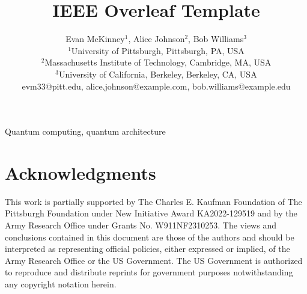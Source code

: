 \documentclass[10pt,conference]{IEEEtran}
\title{IEEE Overleaf Template}
\author{
    Evan McKinney$^{1}$, Alice Johnson$^{2}$, Bob Williams$^{3}$ \\ 
    $^{1}$University of Pittsburgh, Pittsburgh, PA, USA\\
    $^{2}$Massachusetts Institute of Technology, Cambridge, MA, USA\\
    $^{3}$University of California, Berkeley, Berkeley, CA, USA\\
    evm33@pitt.edu, alice.johnson@example.com, bob.williams@example.edu
}
\begin{document}
\maketitle



\begin{IEEEkeywords}
Quantum computing, quantum architecture
\end{IEEEkeywords}




\section*{Acknowledgments}
This work is partially supported by The Charles E. Kaufman Foundation of The Pittsburgh Foundation under New Initiative Award KA2022-129519 and by the Army Research Office under Grants No. W911NF2310253. The views and conclusions contained in this document are those of the authors and should be interpreted as representing official policies, either expressed or implied, of the Army Research Office or the US Government. The US Government is authorized to reproduce and distribute reprints for government purposes notwithstanding any copyright notation herein.


\nocite{*}

\end{document}
